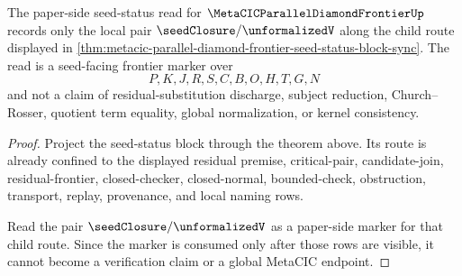 \begin{theorem}
\label{thm:metacic-parallel-diamond-frontier-seed-status-paper-read}
The paper-side seed-status read for $\MetaCICParallelDiamondFrontierUp$ records only the local pair $\seedClosure/\unformalizedV$ along the child route displayed in \autoref{thm:metacic-parallel-diamond-frontier-seed-status-block-sync}. The read is a seed-facing frontier marker over
$$
P,K,J,R,S,C,B,O,H,T,G,N
$$
and not a claim of residual-substitution discharge, subject reduction, Church--Rosser, quotient term equality, global normalization, or kernel consistency.
\end{theorem}
\begin{proof}
Project the seed-status block through the theorem above. Its route is already confined to the displayed residual premise, critical-pair, candidate-join, residual-frontier, closed-checker, closed-normal, bounded-check, obstruction, transport, replay, provenance, and local naming rows.

Read the pair $\seedClosure/\unformalizedV$ as a paper-side marker for that child route. Since the marker is consumed only after those rows are visible, it cannot become a verification claim or a global MetaCIC endpoint.
\end{proof}
